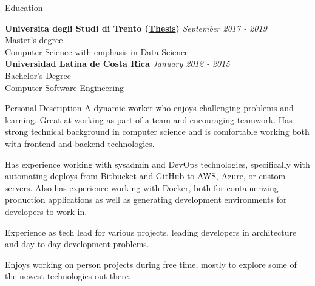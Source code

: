 \documentclass{resume} %
\begin{document}

\begin{rSection}{Education}

{\bf Universita degli Studi di Trento (\href{https://github.com/tupini07/Master-Thesis/tree/master}{Thesis})} \hfill {\em September 2017 - 2019} 
\\ Master's degree \hfill 
\\ Computer Science with emphasis in Data Science \\


{\bf Universidad Latina de Costa Rica} \hfill {\em January 2012 - 2015} 
\\ Bachelor’s Degree \hfill 
\\ Computer Software Engineering 




\end{rSection}


\begin{rSection}{Personal Description}
    A dynamic worker who enjoys challenging problems and learning. Great at working as part of a team and encouraging teamwork. Has strong technical background in computer science and is comfortable working both with frontend and backend technologies.

    Has experience working with sysadmin and DevOps technologies, specifically with automating deploys from Bitbucket and GitHub to AWS, Azure, or custom servers. Also has experience working with Docker, both for containerizing production applications as well as generating development environments for developers to work in.

    Experience as tech lead for various projects, leading developers in architecture and day to day development problems.

    Enjoys working on person projects during free time, mostly to explore some of the newest technologies out there.
\end{rSection}

\end{document}
